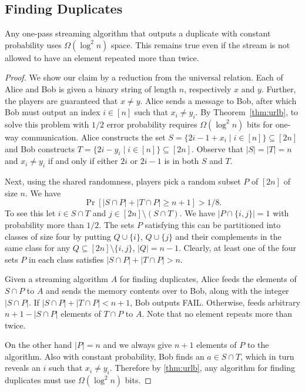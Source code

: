 \subsection{Finding Duplicates}\label{sec:dublb}
\begin{theorem}\label{thm:duplb}
Any one-pass streaming algorithm that outputs a duplicate with constant
probability  uses $\Omega(\log^2 n)$ space. This remains true even if the
stream is not allowed to have an element repeated more than twice. 
\end{theorem}
\begin{proof}
We show our claim by a reduction from the universal relation. Each of
 Alice and Bob is given a binary string of length $n$, respectively $x$ 
and $y$. Further, the players are guaranteed that $x\neq y$. Alice 
sends a message to Bob, after which Bob must output an index 
$i\in[n]$ such that $x_i\neq y_i$. By Theorem~\ref{thm:urlb}, to solve this 
problem with $1/2$ error probability requires $\Omega(\log^2 n)$ bits for one-way communication. 
Alice constructs the set $S=\{2i-1+x_i\mid i\in[n]\}\subseteq[2n]$ and Bob
constructs $T=\{2i-y_i\mid i\in[n]\}\subseteq[2n]$. Observe that $|S|=|T|=n$ 
and $x_i\neq y_i$ if and only if either $2i$ or $2i-1$ is in both $S$ and
$T$.

Next, using the shared randomness, players pick a random subset 
$P$ of $[2n]$ of size $n$. We have
$$\Pr[|S\cap P| + |T\cap P|\geq n+1]>1/8.$$
To see this let $i\in S\cap T$ and $j\in[2n]\setminus(S\cap T)$. We have
$|P\cap\{i,j\}|=1$ with probability more than $1/2$. The sets $P$ satisfying
this can be partitioned into classes of size four by putting $Q\cup\{i\}$,
$Q\cup\{j\}$ and their complements in the same class for any
$Q\subseteq[2n]\setminus\{i,j\}$, $|Q|=n-1$. Clearly, at least one of the four
sets $P$ in each class satisfies $|S\cap P|+|T\cap P|>n$.

Given a streaming 
algorithm $A$ for finding duplicates, Alice feeds the elements of 
$S\cap P$ to $A$ and sends the memory contents over to Bob, 
along with the integer $|S\cap P|$. If $|S\cap P|+|T\cap P|<n+1$, 
Bob outputs FAIL. Otherwise, feeds arbitrary $n+1-|S\cap P|$ 
elements of $T\cap P$ to $A$. Note that no element repeats more than twice.

On the other hand $|P|=n$ and we always give $n+1$ elements of $P$ 
to the algorithm. Also with constant probability, Bob finds an 
$a\in S \cap T$, which in turn reveals an $i$ such that $x_i\neq y_i$. 
Therefore by \autoref{thm:urlb}, any algorithm for finding 
duplicates must use $\Omega(\log^2 n)$ bits.
\end{proof}

